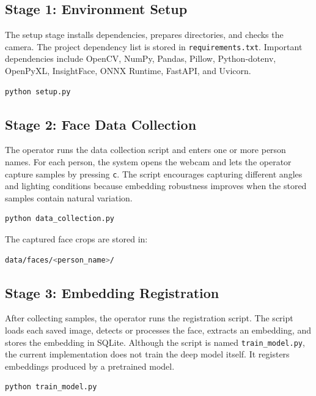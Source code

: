 \documentclass[12pt,a4paper]{report}
\newcommand{\JustifiedNormal}{\fontsize{12}{14}\selectfont\justifying\setlength{\parindent}{0pt}}
\begin{document}
\subsection{Stage 1: Environment Setup}
\JustifiedNormal
The setup stage installs dependencies, prepares directories, and checks the camera. The project dependency list is stored in \texttt{requirements.txt}. Important dependencies include OpenCV, NumPy, Pandas, Pillow, Python-dotenv, OpenPyXL, InsightFace, ONNX Runtime, FastAPI, and Uvicorn.

\begin{lstlisting}[language=bash,caption={Setup command}]
python setup.py
\end{lstlisting}

\subsection{Stage 2: Face Data Collection}
\JustifiedNormal
The operator runs the data collection script and enters one or more person names. For each person, the system opens the webcam and lets the operator capture samples by pressing \texttt{c}. The script encourages capturing different angles and lighting conditions because embedding robustness improves when the stored samples contain natural variation.

\begin{lstlisting}[language=bash,caption={Face data collection command}]
python data_collection.py
\end{lstlisting}

The captured face crops are stored in:

\begin{lstlisting}[language=bash]
data/faces/<person_name>/
\end{lstlisting}

\subsection{Stage 3: Embedding Registration}
\JustifiedNormal
After collecting samples, the operator runs the registration script. The script loads each saved image, detects or processes the face, extracts an embedding, and stores the embedding in SQLite. Although the script is named \texttt{train\_model.py}, the current implementation does not train the deep model itself. It registers embeddings produced by a pretrained model.

\begin{lstlisting}[language=bash,caption={Embedding registration command}]
python train_model.py
\end{lstlisting}
\end{document}
